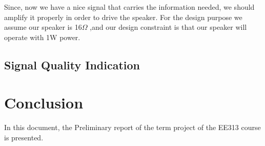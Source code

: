 \documentclass[a4paper,10pt]{article}
\begin{document}
Since, now we have a nice signal that carries the information needed, we should amplify it properly in order to drive the speaker. For the design purpose we assume our speaker is 16\(\Omega\) ,and our design constraint is that our speaker will operate with 1W power.
   
\subsection{Signal Quality Indication}

\section{Conclusion}
In this document, the Preliminary report of the term project of the EE313 course is presented. 
\end{document}
